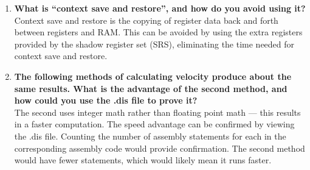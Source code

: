\documentclass{article}
\begin{document}
\begin{enumerate}[label=\textbf{\arabic*})]
    \item \textbf{What is “context save and restore”, and how do you avoid using it?} \\

    Context save and restore is the copying of register data back and forth between registers and RAM. 
    This can be avoided by using the extra registers provided by the shadow register set (SRS), 
    eliminating the time needed for context save and restore.

    \item \textbf{The following methods of calculating velocity produce about the same results. What is the 
    advantage of the second method, and how could you use the .dis file to prove it?} \\

    The second uses integer math rather than floating point math --- this results in a faster computation.
    The speed advantage can be confirmed by viewing the .dis file. Counting the number of assembly statements
    for each in the corresponding assembly code would provide confirmation. The second method would have 
    fewer statements, which would likely mean it runs faster.


\end{enumerate}
\end{document}
